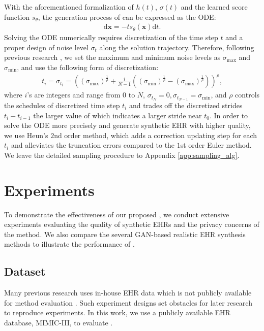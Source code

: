 With the aforementioned formalization of $h(t)$, $\sigma(t)$ and the learned score function $s_\theta$, the generation process of \modelname can be expressed as the ODE:
\begin{align}
    \mathrm{d}\boldsymbol{x}=-t s_\theta(\boldsymbol{x})\mathrm{d}t. \label{odefin}
\end{align}
Solving the ODE numerically requires discretization of the time step $t$ and a proper design of noise level $\sigma_t$ along the solution trajectory. Therefore, following previous research \citep{Karras2022edm}, we set the maximum and minimum noise levels as $\sigma_{\text{max}}$ and $\sigma_{\text{min}}$, and use the following form of discretization:
\begin{align}
t_i=\sigma_{t_i}=\left((\sigma_{\text{max}})^{\frac{1}{\rho}}+\frac{i}{N-1}\left((\sigma_{\text{min}})^{\frac{1}{\rho}}-(\sigma_{\text{max}})^{\frac{1}{\rho}}\right)\right)^{\rho},
\end{align}
where $i$'s are integers and range from $0$ to $N$, $\sigma_{t_N} = 0, \sigma_{t_{N-1}} = \sigma_{\text{min}}$, and $\rho$ controls the schedules of discretized time step $t_i$ and trades off the discretized strides $t_i-t_{i-1}$ the larger value of which indicates a larger stride near $t_0$. 
In order to solve the ODE more precisely and generate synthetic EHR with higher quality, we use Heun's $2$nd order method, which adds a correction updating step for each $t_i$ and alleviates the truncation errors compared to the $1$st order Euler method. We leave the detailed sampling procedure to Appendix \ref{app:sampling_alg}.

\section{Experiments}

To demonstrate the effectiveness of our proposed \modelname, we conduct extensive experiments evaluating the quality of synthetic EHRs and the privacy concerns of the method. We also compare \modelname the several GAN-based realistic EHR synthesis methods to illustrate the performance of \modelname.

\subsection{Dataset}

Many previous research uses in-house EHR data which is not publicly available for method evaluation \citep{EHRgan,Yan2020GeneratingEH}. Such experiment designs set obstacles for later research to reproduce experiments. In this work, we use a publicly available EHR database, MIMIC-III, to evaluate \modelname. 

